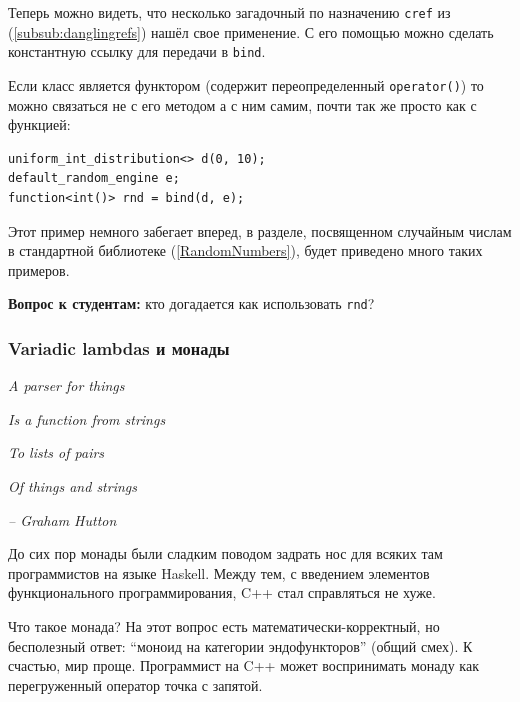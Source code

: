 \documentclass[a4paper,12pt,oneside]{article}
\newif\ifanswers
\begin{document}
\ifanswers
Первый аргумент \lstinline!f1! привязан к \lstinline!n2!, второй к \lstinline!n1!, третий 42, четвертый \lstinline!n! по ссылке, то есть 10, пятый \lstinline!n! по значению то есть 7, а аргумент 1001 не использован вообще.
\fi

Теперь можно видеть, что несколько загадочный по назначению \lstinline!cref! из (\ref{subsub:danglingrefs}) нашёл свое применение. С его помощью можно сделать константную ссылку для передачи в \lstinline!bind!.

Если класс является функтором (содержит переопределенный \lstinline!operator()!) то можно связаться не с его методом а с ним самим, почти так же просто как с функцией:

\begin{lstlisting}
uniform_int_distribution<> d(0, 10);
default_random_engine e;
function<int()> rnd = bind(d, e);
\end{lstlisting}

Этот пример немного забегает вперед, в разделе, посвященном случайным числам в стандартной библиотеке (\ref{RandomNumbers}), будет приведено много таких примеров.

\textbf{Вопрос к студентам:} кто догадается как использовать \lstinline!rnd!?

\ifanswers
Правильный ответ: просто вызвать.
\fi

\subsubsection{Variadic lambdas и монады}\label{Monads}

\hfill\textit{A parser for things}

\hfill\textit{Is a function from strings}

\hfill\textit{To lists of pairs}

\hfill\textit{Of things and strings}{\vspace{0.5em}}

\hfill\textit{-- Graham Hutton}

До сих пор монады были сладким поводом задрать нос для всяких там программистов на языке Haskell. Между тем, с введением элементов функционального программирования, C++ стал справляться не хуже.

Что такое монада? На этот вопрос есть математически-корректный, но бесполезный ответ: ``моноид на категории эндофункторов'' (общий смех). К счастью, мир проще. Программист на C++ может воспринимать монаду как перегруженный оператор точка с запятой.
\end{document}
